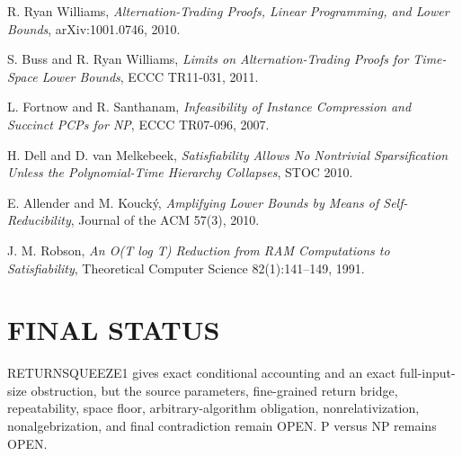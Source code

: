 \documentclass[11pt]{article}
\begin{document}
R. Ryan Williams, \emph{Alternation-Trading Proofs, Linear Programming, and Lower Bounds}, arXiv:1001.0746, 2010.

S. Buss and R. Ryan Williams, \emph{Limits on Alternation-Trading Proofs for Time-Space Lower Bounds}, ECCC TR11-031, 2011.

L. Fortnow and R. Santhanam, \emph{Infeasibility of Instance Compression and Succinct PCPs for NP}, ECCC TR07-096, 2007.

H. Dell and D. van Melkebeek, \emph{Satisfiability Allows No Nontrivial Sparsification Unless the Polynomial-Time Hierarchy Collapses}, STOC 2010.

E. Allender and M. Kouck\'y, \emph{Amplifying Lower Bounds by Means of Self-Reducibility}, Journal of the ACM 57(3), 2010.

J. M. Robson, \emph{An O(T log T) Reduction from RAM Computations to Satisfiability}, Theoretical Computer Science 82(1):141--149, 1991.

\section*{FINAL STATUS}
RETURNSQUEEZE1 gives exact conditional accounting and an exact full-input-size obstruction, but the source parameters, fine-grained return bridge, repeatability, space floor, arbitrary-algorithm obligation, nonrelativization, nonalgebrization, and final contradiction remain OPEN. P versus NP remains OPEN.

\end{document}
